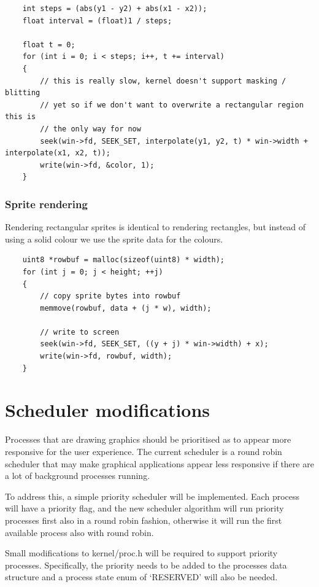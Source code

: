 \begin{verbatim}
    int steps = (abs(y1 - y2) + abs(x1 - x2));
    float interval = (float)1 / steps;

    float t = 0;
    for (int i = 0; i < steps; i++, t += interval)
    {
        // this is really slow, kernel doesn't support masking / blitting
        // yet so if we don't want to overwrite a rectangular region this is
        // the only way for now
        seek(win->fd, SEEK_SET, interpolate(y1, y2, t) * win->width + interpolate(x1, x2, t));
        write(win->fd, &color, 1);
    }
\end{verbatim}

\subsubsection{Sprite rendering}
Rendering rectangular sprites is identical to rendering rectangles, but instead
of using a solid colour we use the sprite data for the colours.

\begin{verbatim}
    uint8 *rowbuf = malloc(sizeof(uint8) * width);
    for (int j = 0; j < height; ++j)
    {
        // copy sprite bytes into rowbuf
        memmove(rowbuf, data + (j * w), width);

        // write to screen
        seek(win->fd, SEEK_SET, ((y + j) * win->width) + x);
        write(win->fd, rowbuf, width);
    }
\end{verbatim}

\section{Scheduler modifications}
Processes that are drawing graphics should be prioritised as to appear more
responsive for the user experience. The current scheduler is a round robin 
scheduler that may make graphical applications appear less responsive if there are a
lot of background processes running.

To address this, a simple priority scheduler will be implemented. Each process will
have a priority flag, and the new scheduler algorithm will run priority processes
first also in a round robin fashion, otherwise it will run the first available
process also with round robin.

Small modifications to kernel/proc.h will be required to support priority processes.
Specifically, the priority needs to be added to the processes data structure and a
process state enum of `RESERVED' will also be needed.


